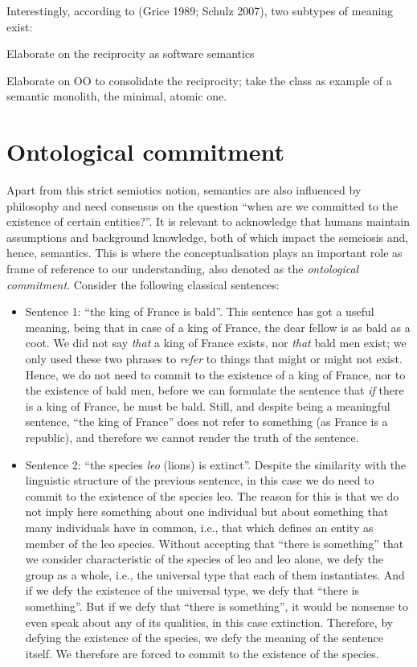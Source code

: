 \documentclass[a4paper,11pt,oneside,oldfontcommands]{memoir}
\theoremstyle{definition}
\theoremstyle{break}		%
\numberwithin{equation}{chapter}
\numberwithin{figure}{chapter}
\begin{document}
Interestingly, according to (Grice 1989; Schulz 2007), two subtypes of
meaning exist:

Elaborate on the reciprocity as software semantics

Elaborate on OO to consolidate the reciprocity; take the class as
example of a semantic monolith, the minimal, atomic one.

\hypertarget{ontological-commitment}{%
\section{Ontological commitment}\label{ontological-commitment}}

Apart from this strict semiotics notion, semantics are also influenced
by philosophy and need consensus on the question ``when are we committed
to the existence of certain entities?''. It is relevant to acknowledge
that humans maintain assumptions and background knowledge, both of which
impact the semeiosis and, hence, semantics. This is where the
conceptualisation plays an important role as frame of reference to our
understanding, also denoted as the \emph{ontological commitment}.
Consider the following classical sentences:

\begin{itemize}
\tightlist
\item
  Sentence 1: ``the king of France is bald''. This sentence has got a
  useful meaning, being that in case of a king of France, the dear
  fellow is as bald as a coot. We did not say \emph{that} a king of
  France exists, nor \emph{that} bald men exist; we only used these two
  phrases to \emph{refer} to things that might or might not exist.
  Hence, we do not need to commit to the existence of a king of France,
  nor to the existence of bald men, before we can formulate the sentence
  that \emph{if} there is a king of France, he must be bald. Still, and
  despite being a meaningful sentence, ``the king of France'' does not
  refer to something (as France is a republic), and therefore we cannot
  render the truth of the sentence.
\item
  Sentence 2: ``the species \emph{leo} (lions) is extinct''. Despite the
  similarity with the linguistic structure of the previous sentence, in
  this case we do need to commit to the existence of the species leo.
  The reason for this is that we do not imply here something about one
  individual but about something that many individuals have in common,
  i.e., that which defines an entity as member of the leo species.
  Without accepting that ``there is something'' that we consider
  characteristic of the species of leo and leo alone, we defy the group
  as a whole, i.e., the universal type that each of them instantiates.
  And if we defy the existence of the universal type, we defy that
  ``there is something''. But if we defy that ``there is something'', it
  would be nonsense to even speak about any of its qualities, in this
  case extinction. Therefore, by defying the existence of the species,
  we defy the meaning of the sentence itself. We therefore are forced to
  commit to the existence of the species.
\end{itemize}
\end{document}
